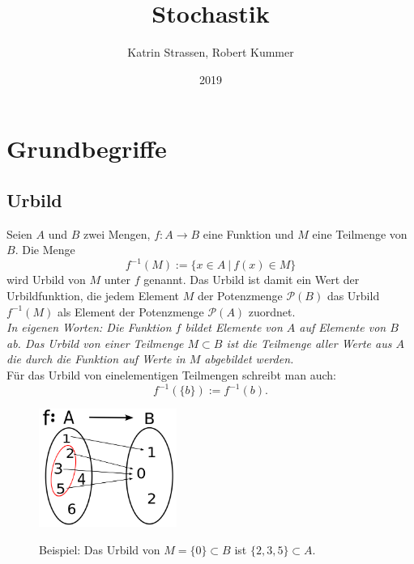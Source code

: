 \documentclass[paper=a4,10pt]{scrartcl}
\title{Stochastik}
\author{Katrin Strassen, Robert Kummer}
\date{2019}
\begin{document}
\maketitle
\newpage
\tableofcontents
\newpage
{}
\setcounter{page}{1}
\section{Grundbegriffe}
\subsection{Urbild}
Seien $A$ und $B$ zwei Mengen, $f: A \rightarrow B$ eine Funktion und $M$ eine Teilmenge von $B$. Die Menge
\begin{equation}
f^{-1}(M) := \{ x \in A \ | \ f(x) \in M \}
\end{equation}
wird Urbild von $M$ unter $f$ genannt. Das Urbild ist damit ein Wert der Urbildfunktion, die jedem Element $M$ der Potenzmenge $\mathcal{P}(B)$ das Urbild $f^{-1}(M)$ als Element der Potenzmenge $\mathcal{P}(A)$ zuordnet.\\

\noindent
\textit{In eigenen Worten: Die Funktion $f$ bildet Elemente von $A$ auf Elemente von $B$ ab. Das Urbild von einer Teilmenge $M \subset B$ ist die Teilmenge aller Werte aus $A$ die durch die Funktion auf Werte in $M$ abgebildet werden.}\\

\noindent
Für das Urbild von einelementigen Teilmengen schreibt man auch:
\begin{equation}
f^{-1}(\{b\}) := f^{-1}(b).
\end{equation}

\begin{figure}[h]
\centering
\includegraphics[width=0.4\textwidth]{../Bilder/urbild.png}
\label{urbild}
\caption{Beispiel: Das Urbild von $M=\{0\} \subset B$ ist $\{2,3,5\} \subset A$.}
\end{figure}
\end{document}
